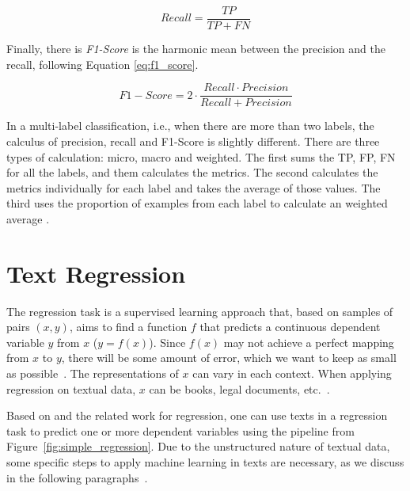     \begin{equation}
        Recall = \frac{TP}{TP+FN}\label{eq:recall}
    \end{equation}
    
 Finally, there is \textit{F1-Score} is the harmonic mean between the precision and the recall, following Equation \ref{eq:f1_score}.
    
    \begin{equation}
        F1-Score = 2\cdot \frac{Recall\cdot Precision}{Recall + Precision}\label{eq:f1_score}
    \end{equation}


In a multi-label  classification, i.e., when there are more than two labels, the calculus of precision, recall and F1-Score is slightly different. There are three types of calculation: micro, macro and weighted. The first sums the \gls{TP}, \gls{FP}, \gls{FN} for all the labels, and them calculates the metrics. The second calculates the metrics individually for each label and takes the average of those values. The third uses the proportion of examples from each label to calculate an weighted average \cite{Uysal2016}.




\section{Text Regression}\label{sec:back_regression}



The regression task is a supervised learning approach that, based on samples of pairs $(x,y)$, aims to find a function $f$ that predicts a continuous dependent variable $y$ from $x$ ($y = f(x)$). Since $f(x)$ may not achieve a perfect mapping from $x$ to $y$, there will be some amount of error, which we want to keep as small as possible~\cite{Draper1998}. The representations of $x$ can vary in each context. When applying regression on textual data, $x$ can be books, legal documents, etc.~\cite{Aggarwal2018}.

Based on \textcite{Kowsari2019} and the related work for regression, one can use texts in a regression task to predict one or more dependent variables using the pipeline from Figure~\ref{fig:simple_regression}. Due to the unstructured nature of textual data, some specific steps to apply machine learning in texts are necessary, as we discuss in the following paragraphs~\cite{Aggarwal2018}.


